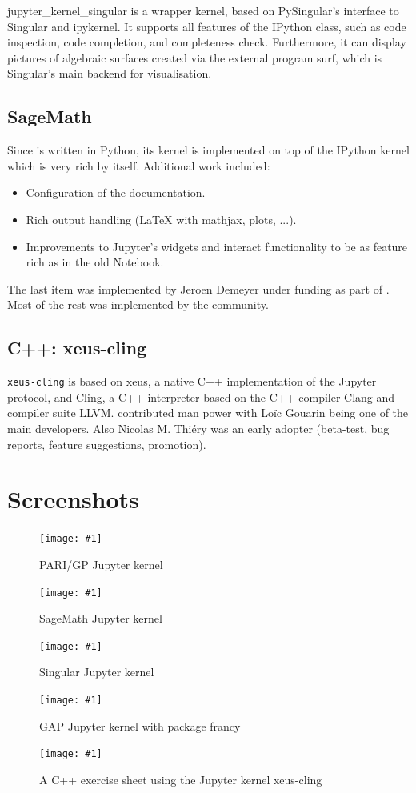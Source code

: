 \documentclass{deliverablereport}
\begin{document}
jupyter\_kernel\_singular is a wrapper kernel, based on PySingular's interface to Singular and ipykernel.
It supports all features of the IPython class, such as code inspection, code completion, and completeness check.
Furthermore, it can display pictures of algebraic surfaces
created via the external program surf, which is Singular's main backend for visualisation.

\subsection{SageMath}

Since \Sage is written in Python, its kernel is implemented
on top of the IPython kernel which is very rich by itself.
Additional work included:
\begin{itemize}
\item Configuration of the documentation.
\item Rich output handling (LaTeX with mathjax, plots, ...).
\item Improvements to Jupyter's widgets and interact functionality to be as feature rich as in the old \Sage Notebook.
\end{itemize}
The last item was implemented by Jeroen Demeyer under \ODK funding as part of .
Most of the rest was implemented by the \Sage community.

\subsection{C++: xeus-cling}

\texttt{xeus-cling} is based on xeus, a native C++ implementation of
the Jupyter protocol, and Cling, a C++ interpreter based on the C++
compiler Clang and compiler suite LLVM. \ODK contributed man power
with Loïc Gouarin being one of the main developers. Also Nicolas M.
Thiéry was an early adopter (beta-test, bug reports, feature
suggestions, promotion).


\appendix
\section{Screenshots}
\newcommand{\screenshot}[2]{
\begin{figure}[ht]
  \texttt{[image: \#1]}
  \caption{#2}
\end{figure}}

\screenshot{pari.png}{PARI/GP Jupyter kernel}
\screenshot{sage.png}{SageMath Jupyter kernel}
\screenshot{singular_new.png}{Singular Jupyter kernel}
\clearpage
\screenshot{gap.png}{GAP Jupyter kernel with package francy}
\clearpage
\screenshot{cling-teaching.png}{A C++ exercise sheet using the Jupyter kernel xeus-cling}
\end{document}
